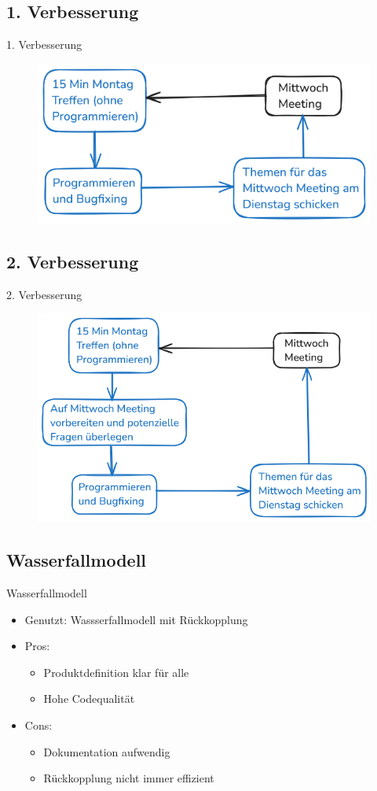 \subsection{1. Verbesserung}
\begin{frame}{1. Verbesserung}
    \begin{figure}
        \centering
        \includegraphics[width=0.6\linewidth]{pictures/level2}
        \label{fig:lvl2}
    \end{figure}
\end{frame}

\subsection{2. Verbesserung}
\begin{frame}{2. Verbesserung}
    \begin{figure}
        \centering
        \includegraphics[width=0.6\linewidth]{pictures/level3}
        \label{fig:lvl3}
    \end{figure}
\end{frame}

\subsection{Wasserfallmodell}
\begin{frame}{Wasserfallmodell}
    \begin{itemize}
        \item Genutzt: Wassserfallmodell mit Rückkopplung
        \item Pros:
        \begin{itemize}
            \item Produktdefinition klar für alle
            \item Hohe Codequalität
        \end{itemize}
        \item Cons:
        \begin{itemize}
            \item Dokumentation aufwendig
            \item Rückkopplung nicht immer effizient
        \end{itemize}
    \end{itemize}
\end{frame}